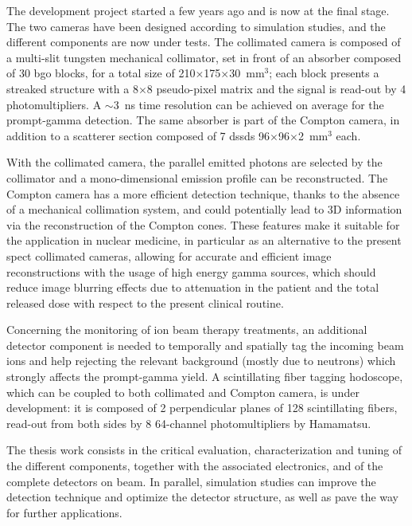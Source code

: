 The development project started a few years ago and is now at the final stage. The two cameras have been designed according to simulation studies, and the different components are now under tests.
The collimated camera is composed of a multi-slit tungsten mechanical collimator, set in front of an absorber composed of 30 \gls{bgo} blocks, for a total size of 210$\times$175$\times$30~mm$^{3}$; each block presents a streaked structure with a 8$\times$8 pseudo-pixel matrix and the signal is read-out by 4 photomultipliers. A $\sim$3~ns time resolution can be achieved on average for the prompt-gamma detection. The same absorber is part of the Compton camera, in addition to a scatterer section composed of 7 \glspl{dssd} 96$\times$96$\times$2~mm$^{3}$ each.

With the collimated camera, the parallel emitted photons are selected by the collimator and a mono-dimensional emission profile can be reconstructed. The Compton camera has a more efficient detection technique, thanks to the absence of a mechanical collimation system, and could potentially lead to 3D information via the reconstruction of the Compton cones. These features make it suitable for the application in nuclear medicine, in particular as an alternative to the present \gls{spect} collimated cameras, allowing for accurate and efficient image reconstructions with the usage of high energy gamma sources, which should reduce image blurring effects due to attenuation in the patient and the total released dose with respect to the present clinical routine.
 
Concerning the monitoring of ion beam therapy treatments, an additional detector component is needed to temporally and spatially tag the incoming beam ions and help rejecting the relevant background (mostly due to neutrons) which strongly affects the prompt-gamma yield. A scintillating fiber tagging hodoscope, which can be coupled to both collimated and Compton camera, is under development: it is composed of 2 perpendicular planes of 128 scintillating fibers, read-out from both sides by 8 64-channel photomultipliers by Hamamatsu.
 
The thesis work consists in the critical evaluation, characterization and tuning of the different components, together with the associated electronics, and of the complete detectors on beam. In parallel, simulation studies can improve the detection technique and optimize the detector structure, as well as pave the way for further applications.

